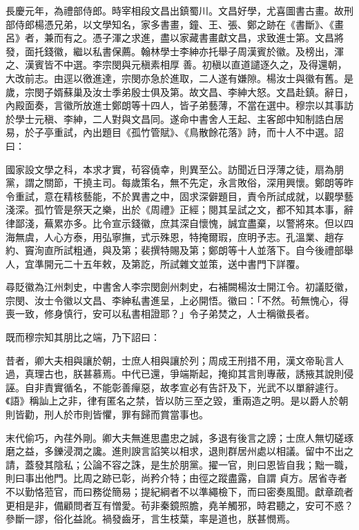 \begin{pinyinscope}
 長慶元年，為禮部侍郎。時宰相段文昌出鎮蜀川。文昌好學，尤喜圖書古畫。故刑部侍郎楊憑兄弟，以文學知名，家多書畫，鐘、王、張、鄭之跡在《書斷》、《畫呂》者，兼而有之。憑子渾之求進，盡以家藏書畫獻文昌，求致進士第。文昌將發，面托錢徽，繼以私書保薦。翰林學士李紳亦托舉子周漢賓於徽。及榜出，渾之、漢賓皆不中選。李宗閔與元稹素相厚
 善。初稹以直道譴逐久之，及得還朝，大改前志。由逕以徼進達，宗閔亦急於進取，二人遂有嫌隙。楊汝士與徽有舊。是歲，宗閔子婿蘇巢及汝士季弟殷士俱及第。故文昌、李紳大怒。文昌赴鎮。辭日，內殿面奏，言徽所放進士鄭朗等十四人，皆子弟藝薄，不當在選中。穆宗以其事訪於學士元稹、李紳，二人對與文昌同。遂命中書舍人王起、主客郎中知制誥白居易，於子亭重試，內出題目《孤竹管賦》、《鳥散餘花落》詩，而十人不中選。詔曰：



 國家設文學之科，本求才實，茍容僥幸，則異至公。訪聞近日浮薄之徒，扇為朋黨，謂之關節，干撓主司。每歲策名，無不先定，永言敗俗，深用興懷。鄭朗等昨令重試，意在精核藝能，不於異書之中，固求深僻題目，責令所試成就，以觀學藝淺深。孤竹管是祭天之樂，出於《周禮》正經；閱其呈試之文，都不知其本事，辭律鄙淺，蕪累亦多。比令宣示錢徽，庶其深自懷愧，誠宜盡棄，以警將來。但以四海無虞，人心方泰，用弘寧撫，式示殊恩，特掩爾瑕，庶明予志。孔溫業、趙存約、竇洵直所試粗通，與及第；裴撰特賜及第；鄭朗等十人並落下。自今後禮部舉人，宜準開元二十五年敕，及第訖，所試雜文並策，送中書門下詳覆。



 尋貶徽為江州刺史，中書舍人李宗閔劍州刺史，右補闕楊汝士開江令。初議貶徽，宗閔、汝士令徽以文昌、李紳私書進呈，上必開悟。徽曰：「不然。茍無愧心，得喪一致，修身慎行，安可以私書相證耶？」令子弟焚之，人士稱徽長者。



 既而穆宗知其朋比之端，乃下詔曰：



 昔者，卿大夫相與讓於朝，士庶人相與讓於列；周成王刑措不用，漢文帝恥言人過，真理古也，朕甚慕焉。中代已還，爭端斯起，掩抑其言則專蔽，誘掖其說則侵誣。自非責實循名，不能彰善癉惡，故孝宣必有告訐及下，光武不以單辭遽行。《語》稱訕上之非，律有匿名之禁，皆以防三至之毀，重兩造之明。是以爵人於朝則皆勸，刑人於市則皆懼，罪有歸而賞當事也。



 末代偷巧，內荏外剛。卿大夫無進思盡忠之誠，多退有後言之謗；士庶人無切磋琢磨之益，多鑠浸潤之讒。進則諛言諂笑以相求，退則群居州處以相議。留中不出之請，蓋發其陰私；公論不容之誅，是生於朋黨。擢一官，則曰恩皆自我；黜一職，則曰事出他門。比周之跡已彰，尚矜介特；由徑之蹤盡露，自謂
 貞方。居省寺者不以勤恪蒞官，而曰務從簡易；提紀綱者不以準繩檢下，而曰密奏風聞。獻章疏者更相是非，備顧問者互有憎愛。茍非秦鏡照膽，堯羊觸邪，時君聽之，安可不惑？參斷一謬，俗化益訛。禍發齒牙，言生枝葉，率是道也，朕甚憫焉。




\end{pinyinscope}
